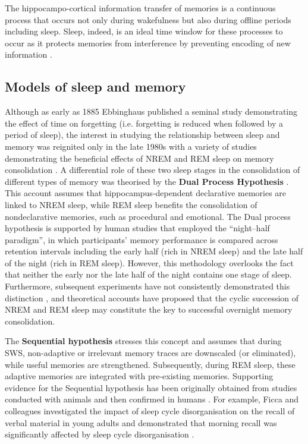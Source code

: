 The hippocampo-cortical information transfer of memories is a continuous process that occurs not only during wakefulness but also during offline periods including sleep. Sleep, indeed, is an ideal time window for these processes to occur as it protects memories from interference by preventing encoding of new information \parencite{ellenbogen_role_2006,rasch_about_2013}.
\FloatBarrier



\subsection{Models of sleep and memory}\label{Intro:sec:Models of sleep and memory}
Although as early as 1885 Ebbinghaus published a seminal study demonstrating the effect of time on forgetting (i.e. forgetting is reduced when followed by a period of sleep), the interest in studying the relationship between sleep and memory was reignited only in the late 1980s with a variety of studies demonstrating the beneficial effects of NREM and REM sleep on memory consolidation \parencite[see][for a review]{rasch_about_2013}. A differential role of these two sleep stages in the consolidation of different types of memory was theorised by the \textbf{Dual Process Hypothesis} \parencite{gais_declarative_2004,rasch_about_2013,smith_sleep_2001}. This account assumes that hippocampus-dependent declarative memories are linked to NREM sleep, while REM sleep benefits the consolidation of nondeclarative memories, such as procedural and emotional. The Dual process hypothesis is supported by human studies that employed the “night–half paradigm”, in which participants’ memory performance is compared across retention intervals including the early half (rich in NREM sleep) and the late half of the night (rich in REM sleep). However, this methodology overlooks the fact that neither the early nor the late half of the night contains one stage of sleep. Furthermore, subsequent experiments have not consistently demonstrated this distinction \parencite[e.g.,][]{fogel_dissociable_2007,huber_arm_2006,rauchs_consolidation_2004}, and theoretical accounts have proposed that the cyclic succession of NREM and REM sleep may constitute the key to successful overnight memory consolidation. 

The \textbf{Sequential hypothesis} \parencite{ambrosini_learning_2001,giuditta_sequential_1995} stresses this concept and assumes that during SWS, non-adaptive or irrelevant memory traces are downscaled (or eliminated), while useful memories are strengthened. Subsequently, during REM sleep, these adaptive memories are integrated with pre-existing memories. Supporting evidence for the Sequential hypothesis has been originally obtained from studies conducted with animals \parencite[e.g.,][]{ambrosini_sequential_1992,ambrosini_sequential_1995} and then confirmed in humans \parencite[e.g.,][]{ficca_morning_2000,mednick_sleep-dependent_2003,stickgold_visual_2000}. For example, Ficca and colleagues investigated the impact of sleep cycle disorganisation on the recall of verbal material in young adults and demonstrated that morning recall was significantly affected by sleep cycle disorganisation \parencite{ficca_morning_2000}.


